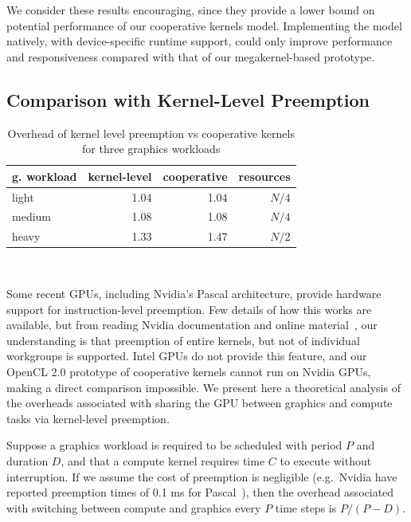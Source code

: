 \documentclass[sigconf]{acmart}
\begin{document}
{We consider these results encouraging, since they provide a lower
bound on potential performance of our cooperative kernels
model. Implementing the model natively, with device-specific runtime
support, could only improve performance and responsiveness compared
with that of our megakernel-based prototype.

\subsection{Comparison with Kernel-Level Preemption}\label{sec:nvidiacomparison}

\begin{table}[t]
\normalsize
\centering
\begin{tabular}{ l r r r}
g. workload &  kernel-level  & cooperative & resources \\
\hline
light & 1.04 & 1.04 & $N/4$\\
medium & 1.08 & 1.08 & $N/4$\\
heavy & 1.33 & 1.47 & $N/2$\\
\end{tabular} \\

\caption{Overhead of kernel level preemption vs cooperative kernels for three
graphics workloads}
\label{tab:preemption}
\end{table}

Some recent GPUs, including Nvidia's Pascal architecture, provide
hardware support for instruction-level preemption.  Few details of how
this works are available, but from reading Nvidia documentation and
online material~\cite{PascalWhitepaper,anandtech}, our understanding
is that preemption of entire kernels, but not of individual workgroups
is supported.  Intel GPUs do not provide this feature, and our OpenCL
2.0 prototype of cooperative kernels cannot run on Nvidia GPUs, making
a direct comparison impossible.  We present here a theoretical
analysis of the overheads associated with sharing the GPU between
graphics and compute tasks via kernel-level preemption.

Suppose a graphics workload is required to be scheduled with period
$P$ and duration $D$, and that a compute kernel requires time $C$ to
execute without interruption.  If we assume the cost of preemption is
negligible (e.g.\ Nvidia have reported preemption times of 0.1 ms for
Pascal~\cite{anandtech}), then the overhead associated with switching
between compute and graphics every $P$ time steps is $P/(P-D)$.

}
\end{document}
